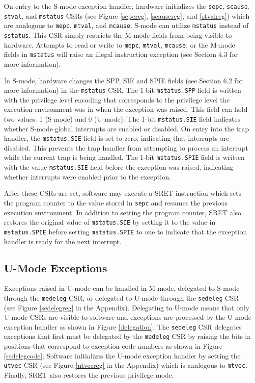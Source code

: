 \documentclass[12pt]{article}
\begin{document}
On entry to the S-mode exception handler, hardware initializes the {\tt{sepc}}, {\tt{scause}}, {\tt{stval}}, and {\tt{mstatus}} CSRs (see Figure \ref{sepcreg}, \ref{scausereg}, and \ref{stvalreg}) which are analogous to {\tt{mepc}}, {\tt{mtval}}, and {\tt{mcause}}. S-mode can utilize {\tt{mstatus}} instead of {\tt{sstatus}}. This CSR simply restricts the M-mode fields from being visible to hardware. Attempts to read or write to {\tt{mepc}}, {\tt{mtval}}, {\tt{mcause}}, or the M-mode fields in {\tt{mstatus}} will raise an illegal instruction exception (see Section 4.3 for more information).

In S-mode, hardware changes the SPP, SIE and SPIE fields (see Section 6.2 for more information) in the {\tt{mstatus}} CSR. The 1-bit {\tt{mstatus.SPP}} field is written with the privilege level encoding that corresponds to the privilege level the execution environment was in when the exception was raised. This field can hold two values: 1 (S-mode) and 0 (U-mode). The 1-bit {\tt{mstatus.SIE}} field indicates whether S-mode global interrupts are enabled or disabled. On entry into the trap handler, the {\tt{mstatus.SIE}} field is set to zero, indicating that interrupts are disabled. This prevents the trap handler from attempting to process an interrupt while the current trap is being handled. The 1-bit {\tt{mstatus.SPIE}} field is written with the value {\tt{mstatus.SIE}} held before the exception was raised, indicating whether interrupts were enabled prior to the exception.

After these CSRs are set, software may execute a SRET instruction which sets the program counter to the value stored in {\tt{sepc}} and resumes the previous execution environment. In addition to setting the program counter, SRET also restores the original value of {\tt{mstatus.SIE}} by setting it to the value in {\tt{mstatus.SPIE}} before setting {\tt{mstatus.SPIE}} to one to indicate that the exception handler is ready for the next interrupt.
 
\subsection{U-Mode Exceptions}
Exceptions raised in U-mode can be handled in M-mode, delegated to S-mode through the {\tt{medeleg}} CSR, or delegated to U-mode through the {\tt{sedeleg}} CSR (see Figure \ref{sedelegreg} in the Appendix). Delegating to U-mode means that only U-mode CSRs are visible to software and exceptions are processed by the U-mode exception handler as shown in Figure \ref{delegation}. The {\tt{sedeleg}} CSR delegates exceptions that first must be delegated by the {\tt{medeleg}} CSR by raising the bits in positions that correspond to exception code numbers as shown in Figure \ref{sedelegcode}. Software initializes the U-mode exception handler by setting the {\tt{utvec}} CSR (see Figure \ref{utvecreg} in the Appendix) which is analogous to {\tt{mtvec}}. Finally, SRET also restores the previous privilege mode.
\end{document}
